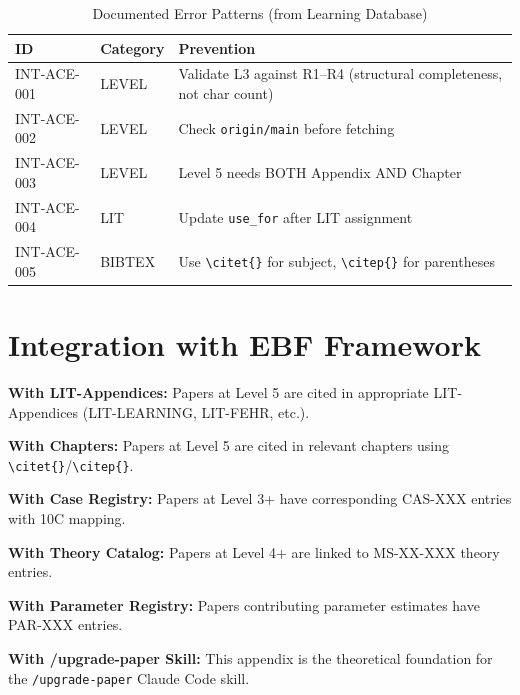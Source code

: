 \begin{table}[htbp]
\centering
\caption{Documented Error Patterns (from Learning Database)}
\label{tab:error-patterns}
\renewcommand{\arraystretch}{1.3}
\begin{tabular}{@{}llp{6cm}@{}}
\toprule
\textbf{ID} & \textbf{Category} & \textbf{Prevention} \\
\midrule
INT-ACE-001 & LEVEL & Validate L3 against R1--R4 (structural completeness, not char count) \\
INT-ACE-002 & LEVEL & Check \texttt{origin/main} before fetching \\
INT-ACE-003 & LEVEL & Level 5 needs BOTH Appendix AND Chapter \\
INT-ACE-004 & LIT & Update \texttt{use\_for} after LIT assignment \\
INT-ACE-005 & BIBTEX & Use \texttt{\textbackslash citet\{\}} for subject, \texttt{\textbackslash citep\{\}} for parentheses \\
\bottomrule
\end{tabular}
\end{table}


\section{Integration with EBF Framework}
\label{sec:paperint-ebf-integration}

\begin{tcolorbox}[colback=yellow!5!white, colframe=yellow!75!black,
    title=Integration: METHOD-PAPERINT $\leftrightarrow$ Other Components]

\textbf{With LIT-Appendices:}
Papers at Level 5 are cited in appropriate LIT-Appendices (LIT-LEARNING, LIT-FEHR, etc.).

\textbf{With Chapters:}
Papers at Level 5 are cited in relevant chapters using \texttt{\textbackslash citet\{\}}/\texttt{\textbackslash citep\{\}}.

\textbf{With Case Registry:}
Papers at Level 3+ have corresponding CAS-XXX entries with 10C mapping.

\textbf{With Theory Catalog:}
Papers at Level 4+ are linked to MS-XX-XXX theory entries.

\textbf{With Parameter Registry:}
Papers contributing parameter estimates have PAR-XXX entries.

\textbf{With /upgrade-paper Skill:}
This appendix is the theoretical foundation for the \texttt{/upgrade-paper} Claude Code skill.

\end{tcolorbox}

